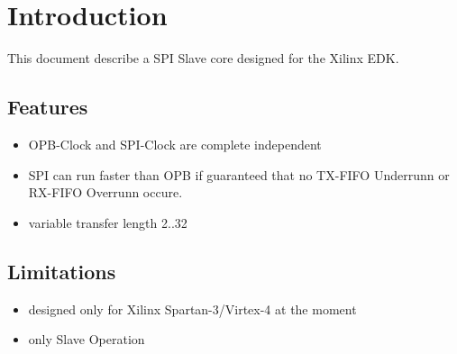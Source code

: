 \chapter{Introduction}
This document describe a SPI Slave core designed for the Xilinx EDK. \cite{bib_xilinx_edk}

\section{Features}
\begin{itemize}
\item OPB-Clock and SPI-Clock are complete independent
\item SPI can run faster than OPB if guaranteed that no TX-FIFO Underrunn or RX-FIFO Overrunn occure.
\item variable transfer length 2..32
\end{itemize}




\section{Limitations}
\begin{itemize}
\item designed only for Xilinx Spartan-3/Virtex-4 at the moment
\item only Slave Operation
\end{itemize}

